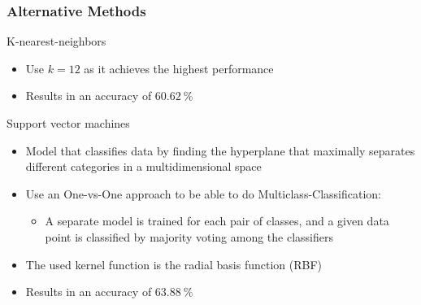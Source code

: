 \documentclass[8pt]{beamer}
\begin{document}
\begin{frame}
{\begin{figure}
\begin{minipage}[b]{0.48\textwidth}
        \end{minipage}
    \end{figure}
}
\end{frame}

\begin{frame}
\frametitle{Alternative Methods}
  \begin{alertblock}{K-nearest-neighbors}
    \begin{itemize}
     \item Use $k=12$ as it achieves the highest performance
     \item Results in an accuracy of $\SI{60.62}{\percent}$
    \end{itemize}
  \end{alertblock}
  \begin{alertblock}{Support vector machines}
    \begin{itemize}
    \item{Model that classifies data by finding the hyperplane that maximally separates different categories in a multidimensional space}
    \item Use an One-vs-One approach to be able to do Multiclass-Classification:
    \begin{itemize}
      \item A separate model is trained for each pair of classes, and a given data point is classified by majority voting among the classifiers
      \end{itemize}
    \item The used kernel function is the radial basis function (RBF)
    \item Results in an accuracy of $\SI{63.88}{\percent}$
    \end{itemize}
  \end{alertblock}
\end{frame}
\end{document}

